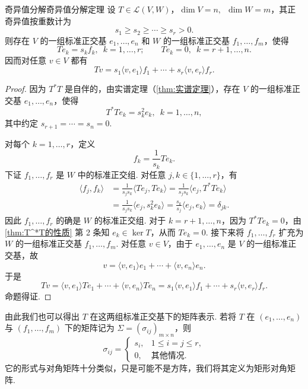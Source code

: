 \begin{theorem}{奇异值分解}{奇异值分解定理} 
    设 $T \in \mathcal{L}(V, W)$，$\dim V = n,\enspace \dim W = m$，其正奇异值按重数计为
    \[
        s_1 \geqslant s_2 \geqslant \cdots \geqslant s_r > 0.
    \]
    则存在 $V$ 的一组标准正交基 $e_1, \ldots, e_n$ 和 $W$ 的一组标准正交基 $f_1, \ldots, f_m$，使得
    \[
        Te_k = s_k f_k,\enspace k = 1, \ldots, r;\qquad Te_k = 0,\enspace k = r+1, \ldots, n.
    \]
    因而对任意 $v \in V$ 都有
    \[
        Tv = s_1 \langle v, e_1 \rangle f_1 + \cdots + s_r \langle v, e_r \rangle f_r.
    \]
\end{theorem}

\begin{proof}
    因为 $T^*T$ 是自伴的，由实谱定理（\autoref{thm:实谱定理}），存在 $V$ 的一组标准正交基 $e_1, \ldots, e_n$，使得
    \[
        T^*Te_k = s_k^2 e_k,\enspace k = 1, \ldots, n,
    \]
    其中约定 $s_{r+1} = \cdots = s_n = 0$.

    对每个 $k = 1, \ldots, r$，定义
    \[
        f_k = \frac{1}{s_k}Te_k.
    \]
    下证 $f_1, \ldots, f_r$ 是 $W$ 中的标准正交组. 对任意 $j, k \in \{1, \ldots, r\}$，有
    \begin{align*}
        \langle f_j, f_k \rangle
         & = \frac{1}{s_j s_k}\langle Te_j, Te_k \rangle
          = \frac{1}{s_j s_k}\langle e_j, T^*Te_k \rangle \\
         & = \frac{1}{s_j s_k}\langle e_j, s_k^2 e_k \rangle
          = \frac{s_k}{s_j}\langle e_j, e_k \rangle
          = \delta_{jk}.
    \end{align*}
    因此 $f_1, \ldots, f_r$ 的确是 $W$ 的标准正交组. 对于 $k = r+1, \ldots, n$，因为 $T^*Te_k = 0$，由\autoref{thm:T^*T的性质} 第 2 条知 $e_k \in \ker T$，从而 $Te_k = 0$. 接下来将 $f_1, \ldots, f_r$ 扩充为 $W$ 的一组标准正交基 $f_1, \ldots, f_m$. 对任意 $v \in V$，由于 $e_1, \ldots, e_n$ 是 $V$ 的一组标准正交基，故
    \[
        v = \langle v, e_1 \rangle e_1 + \cdots + \langle v, e_n \rangle e_n.
    \]
    于是
    \[ Tv = \langle v, e_1 \rangle Te_1 + \cdots + \langle v, e_n \rangle Te_n = s_1 \langle v, e_1 \rangle f_1 + \cdots + s_r \langle v, e_r \rangle f_r. \]
    命题得证.
\end{proof}

由此我们也可以得出 $T$ 在这两组标准正交基下的矩阵表示. 若将 $T$ 在 $(e_1, \ldots, e_n)$ 与 $(f_1, \ldots, f_m)$ 下的矩阵记为 $\Sigma = (\sigma_{ij})_{m \times n}$，则
\[
    \sigma_{ij} =
    \begin{cases}
        s_i, & 1 \leqslant i = j \leqslant r, \\
        0,   & \text{其他情况}.
    \end{cases}
\]
它的形式与对角矩阵十分类似，只是可能不是方阵，我们将其定义为矩形对角矩阵.

